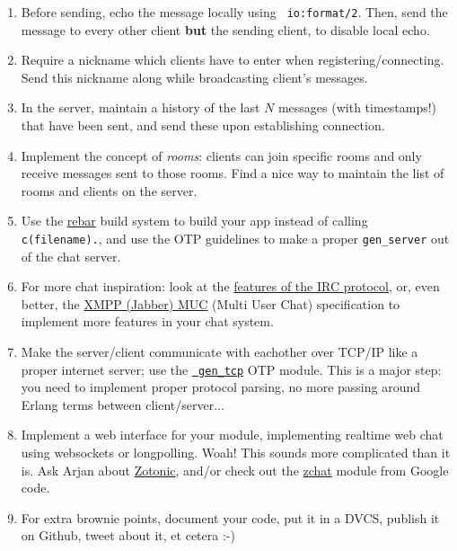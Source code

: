 \documentclass{article}
\begin{document}
\begin{enumerate}

\item Before sending, echo the message locally using {\tt
  io:format/2}. Then, send the message to every other client {\bf but}
  the sending client, to disable local echo.

\item Require a nickname which clients have to enter when
  registering/connecting. Send this nickname along while broadcasting
  client's messages.

\item In the server, maintain a history of the last $N$ messages (with
  timestamps!) that have been sent, and send these upon establishing
  connection.

\item Implement the concept of {\em rooms}: clients can join specific
  rooms and only receive messages sent to those rooms. Find a nice way
  to maintain the list of rooms and clients on the server.

\item Use the \href{https://github.com/basho/rebar}{rebar} build
  system to build your app instead of calling {\tt c(filename).}, and
  use the OTP guidelines to make a proper {\tt gen\_server} out of the
  chat server.
  
\item For more chat inspiration: look at the
  \href{http://tools.ietf.org/html/rfc1459#section-3}{features of the
    IRC protocol}, or, even better, the
  \href{http://xmpp.org/extensions/xep-0045.html}{XMPP (Jabber) MUC}
  (Multi User Chat) specification to implement more features in your
  chat system.

\item Make the server/client communicate with eachother over TCP/IP
  like a proper internet server; use the
  \href{http://ftp.csd.uu.se/pub/mirror/erlang/doc/man/gen\_tcp.html}{{\tt
      gen\_tcp}} OTP module. This is a major step: you need to
  implement proper protocol parsing, no more passing around Erlang
  terms between client/server...

\item Implement a web interface for your module, implementing realtime
  web chat using websockets or longpolling. Woah! This sounds more
  complicated than it is. Ask Arjan about
  \href{http://zotonic.com/}{Zotonic}, and/or check out the
  \href{http://code.google.com/p/zchat/}{zchat} module from Google
  code.

 \item For extra brownie points, document your code, put it in a DVCS,
   publish it on Github, tweet about it, et cetera :-)

\end{enumerate}
\end{document}
